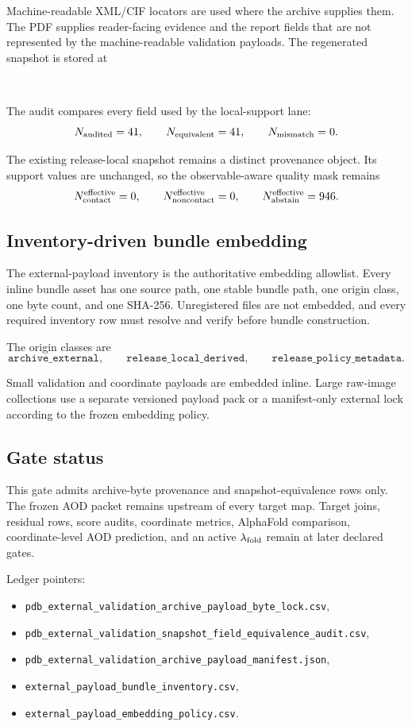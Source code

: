 Machine-readable XML/CIF locators are used where the archive supplies them. The PDF supplies reader-facing evidence and the report fields that are not represented by the machine-readable validation payloads. The regenerated snapshot is stored at
\begin{center}
\small
{}\\
\end{center}

The audit compares every field used by the local-support lane:
\[
N_{\rm audited}=41,
\qquad
N_{\rm equivalent}=41,
\qquad
N_{\rm mismatch}=0.
\]

The existing release-local snapshot remains a distinct provenance object. Its support values are unchanged, so the observable-aware quality mask remains
\[
N_{\rm contact}^{\rm effective}=0,
\qquad
N_{\rm noncontact}^{\rm effective}=0,
\qquad
N_{\rm abstain}^{\rm effective}=946.
\]

\subsection{Inventory-driven bundle embedding}

The external-payload inventory is the authoritative embedding allowlist. Every inline bundle asset has one source path, one stable bundle path, one origin class, one byte count, and one SHA-256. Unregistered files are not embedded, and every required inventory row must resolve and verify before bundle construction.

The origin classes are
\[
\texttt{archive\_external},
\qquad
\texttt{release\_local\_derived},
\qquad
\texttt{release\_policy\_metadata}.
\]

Small validation and coordinate payloads are embedded inline. Large raw-image collections use a separate versioned payload pack or a manifest-only external lock according to the frozen embedding policy.

\subsection{Gate status}

This gate admits archive-byte provenance and snapshot-equivalence rows only. The frozen AOD packet remains upstream of every target map. Target joins, residual rows, score audits, coordinate metrics, AlphaFold comparison, coordinate-level AOD prediction, and an active $\lambda_{\rm fold}$ remain at later declared gates.

Ledger pointers:
\begin{itemize}
\item \texttt{pdb\_external\_validation\_archive\_payload\_byte\_lock.csv},
\item \texttt{pdb\_external\_validation\_snapshot\_field\_equivalence\_audit.csv},
\item \texttt{pdb\_external\_validation\_archive\_payload\_manifest.json},
\item \texttt{external\_payload\_bundle\_inventory.csv},
\item \texttt{external\_payload\_embedding\_policy.csv}.
\end{itemize}
